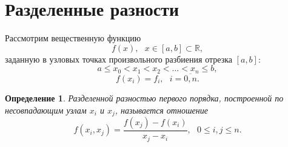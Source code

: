 \documentclass[11pt,a4paper,twoside]{report}
\numberwithin{equation}{section}
\newtheorem*{definition}{Определение}
\theoremstyle{definition}
\theoremstyle{plain}
\begin{document}
\section{Разделенные разности}
%
Рассмотрим вещественную функцию
%
$$
    f(x), ~~~x\in[a,b]\subset\mathbb{R},
$$
%
заданную в узловых точках произвольного разбиения отрезка $[a,b]$:
%
$$
    a\leqslant x_0<x_1<x_2<\ldots<x_n\leqslant b,
$$
%
%
$$
    f(x_i) = f_i, ~~~ i=\overline{0, n}.
$$
%
\begin{definition}
%
    Разделенной разностью первого порядка, построенной по несовпадающим узлам
    $x_i$ и $x_j$, называется отношение
    \begin{equation}
        \label{div_dif_1}
        f(x_i, x_j)=\frac{f(x_j) - f(x_i)}{x_j - x_i},
        ~~~0 \leqslant i,j \leqslant n.
    \end{equation}
%
\end{definition}
%
\end{document}
